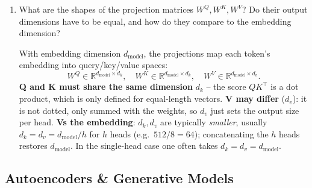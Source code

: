 \documentclass[10pt,a4paper]{article}
\newcommand{\q}[1]{\item #1}
\begin{document}
\begin{enumerate}[leftmargin=*,label=\textbf{Q\arabic*.}]
\q What are the shapes of the projection matrices $W^Q, W^K, W^V$? Do their output dimensions have to be equal, and how do they compare to the embedding dimension?
\begin{answerbox}
With embedding dimension $d_{\text{model}}$, the projections map each token's embedding into query/key/value spaces:
\[
W^Q\in\mathbb{R}^{d_{\text{model}}\times d_k},\quad
W^K\in\mathbb{R}^{d_{\text{model}}\times d_k},\quad
W^V\in\mathbb{R}^{d_{\text{model}}\times d_v}.
\]
\textbf{Q and K must share the same dimension} $d_k$ -- the score $QK^\top$ is a dot product, which is only defined for equal-length vectors. \textbf{V may differ} ($d_v$): it is not dotted, only summed with the weights, so $d_v$ just sets the output size per head. \textbf{Vs the embedding}: $d_k, d_v$ are typically \emph{smaller}, usually $d_k=d_v=d_{\text{model}}/h$ for $h$ heads (e.g.\ $512/8=64$); concatenating the $h$ heads restores $d_{\text{model}}$. In the single-head case one often takes $d_k=d_v=d_{\text{model}}$.
\end{answerbox}

\end{enumerate}

\subsection{Autoencoders \& Generative Models}
\end{document}
